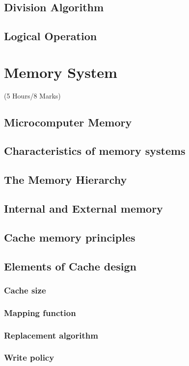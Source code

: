 \documentclass[12pt]{article}
\begin{document}
\subsection{Division Algorithm}
\subsection{Logical Operation}

\pagebreak
\section{Memory System}
\begin{center}(5 Hours/8 Marks)\end{center}
\subsection{Microcomputer Memory}
\subsection{Characteristics of memory systems}
\subsection{The Memory Hierarchy}
\subsection{Internal and External memory}
\subsection{Cache memory principles}
\subsection{Elements of Cache design}
\subsubsection{Cache size}
\subsubsection{Mapping function}
\subsubsection{Replacement algorithm}
\subsubsection{Write policy}
\end{document}
